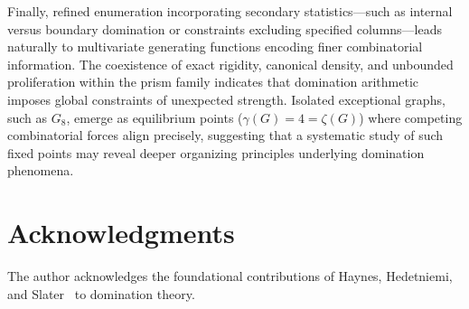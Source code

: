 \documentclass[11pt]{article}
\theoremstyle{plain}
\theoremstyle{definition}
\theoremstyle{remark}
\begin{document}
Finally, refined enumeration incorporating secondary statistics—such as internal versus
boundary domination or constraints excluding specified columns—leads naturally to
multivariate generating functions encoding finer combinatorial information.  The
coexistence of exact rigidity, canonical density, and unbounded proliferation within the
prism family indicates that domination arithmetic imposes global constraints of
unexpected strength.  Isolated exceptional graphs, such as $G_8$, emerge as equilibrium points ($\gamma(G)=4=\zeta(G)$) where competing
combinatorial forces align precisely, suggesting that a systematic study of such fixed points may reveal deeper organizing principles underlying domination phenomena. 

\section*{Acknowledgments}

The author acknowledges the foundational contributions of 
Haynes, Hedetniemi, and Slater~\cite{haynes-hedetniemi-slater-1998-fundamentals, haynes-hedetniemi-slater-1998-advanced} 
to domination theory.
\end{document}
